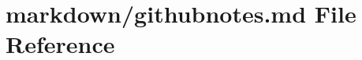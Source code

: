 \hypertarget{githubnotes_8md}{\section{markdown/githubnotes.md File Reference}
\label{githubnotes_8md}
}
